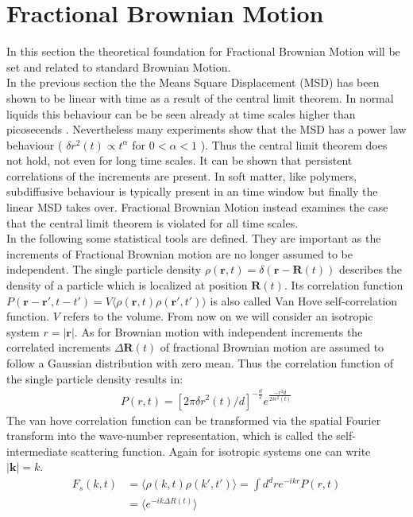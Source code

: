 \documentclass[
  a4paper,BCOR10mm,oneside,
  bibtotoc,idxtotoc,
  headsepline,footsepline,%
  fleqn,openbib
]{scrbook}
\begin{document}
\section{Fractional Brownian Motion}
In this section the theoretical foundation for Fractional Brownian Motion will be set and related to standard Brownian Motion. \\
In the previous section the the Means Square Displacement (MSD) has been shown to be linear with time as a result of the central limit theorem. In normal liquids this behaviour can be be seen already at time scales higher than picosecends \cite{Hofling2013}. Nevertheless many experiments show that the MSD has a power law behaviour ( $\delta r ^2 (t) \propto t^{\alpha}$ for  $0 < \alpha < 1$ ). Thus the central limit theorem does not hold, not even for long time scales. It can be shown that persistent correlations of the increments are present. In soft matter, like polymers, subdiffusive behaviour is typically present in an time window but finally the linear MSD takes over. Fractional Brownian Motion instead examines the case that the central limit theorem is violated for all time scales.\\
In the following some statistical tools are defined. They are important as the increments of Fractional Brownian motion are no longer assumed to be independent. The single particle density $\rho(\bm{r},t)=\delta(\bm{r}-\bm{R}(t))$ describes the density of a particle which is localized at position $\bm{R}(t)$. Its correlation function $P(\bm{r}-\bm{r}',t-t')= V\langle\rho(\bm{r},t) \rho(\bm{r}',t')\rangle$ is also called Van Hove self-correlation function. $V$ refers to the volume. From now on we will consider an isotropic system $ r= |\bm{r}|$. As for Brownian motion with independent increments the correlated increments  $\Delta\bm{R}(t)$ of fractional Brownian motion are assumed to follow a Gaussian distribution with zero mean. Thus the correlation function of the single particle density results in:
\begin{align}
 P(r,t)=[2 \pi \delta r^{2}(t)/d]^{-\frac{d}{2}} e^{ \frac{-r^2 d}{2 \delta r^{2}(t) }}
\end{align}
The van hove correlation function can be transformed via the spatial Fourier transform into the wave-number representation, which is called the self-intermediate scattering function. Again for isotropic systems one can write $|\bm{k}|=k$.
\begin{align}
 F_{s}(k,t)&=\langle\rho(k,t) \rho(k',t')\rangle=\int d^{d}r e^{-i k r} P(r,t) \\
 &=\langle e^{-i k \Delta R(t)} \rangle
\end{align}
\end{document}
